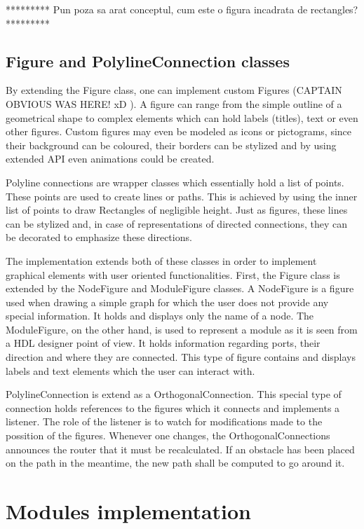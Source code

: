 ********* Pun poza sa arat conceptul, cum este o figura incadrata de rectangles? ********* 

\subsection{Figure and PolylineConnection classes}

By extending the Figure class, one can implement custom Figures (CAPTAIN OBVIOUS WAS HERE! xD ). A figure can 
range from the simple outline of a geometrical shape to complex elements which can hold labels (titles), text 
or even other figures. Custom figures may even be modeled as icons or pictograms, since their background can be 
coloured, their borders can be stylized and by using extended API even animations could be created.

Polyline connections are wrapper classes which essentially hold a list of points. These points are used to create 
lines or paths. This is achieved by using the inner list of points to draw Rectangles of negligible height. Just 
as figures, these lines can be stylized and, in case of representations of directed connections, they can be 
decorated to emphasize these directions.

The implementation extends both of these classes in order to implement graphical elements with user oriented 
functionalities. First, the Figure class is extended by the NodeFigure and ModuleFigure classes. A NodeFigure 
is a figure used when drawing a simple graph for which the user does not provide any special information.
It holds and displays only the name of a node. The ModuleFigure, on the other hand, is used to represent a 
module as it is seen from a HDL designer point of view. It holds information regarding ports, their direction 
and where they are connected. This type of figure contains and displays labels and text elements which the user 
can interact with.

PolylineConnection is extend as a OrthogonalConnection. This special type of connection holds references to the 
figures which it connects and implements a listener. The role of the listener is to watch for modifications made 
to the possition of the figures. Whenever one changes, the OrthogonalConnections announces the router that it 
must be recalculated. If an obstacle has been placed on the path in the meantime, the new path shall be computed 
to go around it.

\section{Modules implementation}

